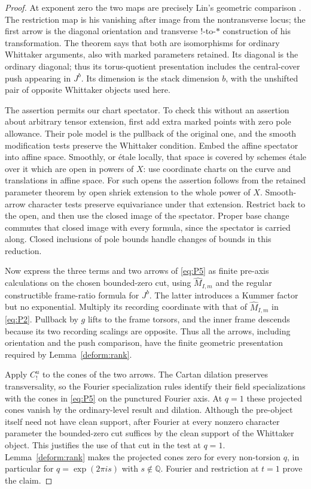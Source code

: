 \begin{proof}
At exponent zero the two maps are precisely Lin's
geometric comparison
\cite[Propositions~2.2.4--2.2.5, Section~2.2.6,
Section~8.1.3 and Proposition~8.1.4, Theorem~9.0.2]{Lin}.
The restriction map is his vanishing after image from
the nontransverse locus; the first arrow is the diagonal
orientation and transverse $!$-to-$*$ construction of
his transformation.  The theorem says that both are
isomorphisms for ordinary Whittaker arguments, also with
marked parameters retained.  Its diagonal is the
ordinary diagonal; thus its torus-quotient presentation
includes the central-cover push appearing in $J^b$.
Its dimension is the stack dimension $b$, with the
unshifted pair of opposite Whittaker objects used here.

The assertion permits our chart spectator.  To check
this without an assertion about arbitrary tensor
extension, first add extra marked points with zero
pole allowance.  Their pole model is the pullback of
the original one, and the smooth modification tests
preserve the Whittaker condition.  Embed the affine
spectator into affine space.  Smoothly, or \'etale
locally, that space is covered by schemes \'etale over
it which are open in powers of $X$: use coordinate
charts on the curve and translations in affine space.
For such opens the assertion follows from the retained
parameter theorem by open shriek extension to the
whole power of $X$.  Smooth-arrow character tests
preserve equivariance under that extension.  Restrict
back to the open, and then use the closed image of
the spectator.  Proper base change commutes that
closed image with every formula, since the spectator
is carried along.  Closed inclusions of pole bounds
handle changes of bounds in this reduction.

Now express the three terms and two arrows of
\eqref{eq:P5} as finite pre-axis calculations on the
chosen bounded-zero cut, using
$\widehat M_{I,m}$ and the regular constructible
frame-ratio formula for $J^b$.  The latter introduces
a Kummer factor but no exponential.  Multiply its
recording coordinate with that of
$\widehat M_{I,m}$ in \eqref{eq:P2}.  Pullback by $g$
lifts to the frame torsors, and the inner frame
descends because its two recording scalings are
opposite.  Thus all the arrows, including orientation
and the push comparison, have the finite geometric
presentation required by Lemma~\ref{deform:rank}.

Apply $C_!^u$ to the cones of the two arrows.  The
Cartan dilation preserves transversality, so the
Fourier specialization rules identify their field
specializations with the cones in \eqref{eq:P5} on
the punctured Fourier axis.  At $q=1$ these projected
cones vanish by the ordinary-level result and
dilation.  Although the pre-object itself need not
have clean support, after Fourier at every nonzero
character parameter the bounded-zero cut suffices
by the clean support of the Whittaker object.  This
justifies the use of that cut in the test at $q=1$.
Lemma~\ref{deform:rank} makes the projected cones
zero for every non-torsion $q$, in particular for
$q=\exp(2\pi i s)$ with $s\notin\mathbb Q$.
Fourier and restriction at $t=1$ prove the claim.


\end{proof}
